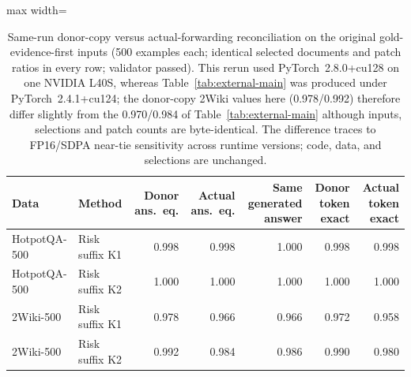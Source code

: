 \begin{table}[t]
\centering
\footnotesize
\begin{adjustbox}{max width=\textwidth}
\begin{tabular}{llrrrrr}
\toprule
Data & Method & Donor ans.\ eq. & Actual ans.\ eq. & Same generated answer & Donor token exact & Actual token exact \\
\midrule
HotpotQA-500 & Risk suffix K1 & 0.998 & 0.998 & 1.000 & 0.998 & 0.998 \\
HotpotQA-500 & Risk suffix K2 & 1.000 & 1.000 & 1.000 & 1.000 & 1.000 \\
2Wiki-500 & Risk suffix K1 & 0.978 & 0.966 & 0.966 & 0.972 & 0.958 \\
2Wiki-500 & Risk suffix K2 & 0.992 & 0.984 & 0.986 & 0.990 & 0.980 \\
\bottomrule
\end{tabular}
\end{adjustbox}
\caption{Same-run donor-copy versus actual-forwarding reconciliation on the original gold-evidence-first inputs (500 examples each; identical selected documents and patch ratios in every row; validator passed). This rerun used PyTorch~2.8.0+cu128 on one NVIDIA L40S, whereas Table~\ref{tab:external-main} was produced under PyTorch~2.4.1+cu124; the donor-copy 2Wiki values here (0.978/0.992) therefore differ slightly from the 0.970/0.984 of Table~\ref{tab:external-main} although inputs, selections and patch counts are byte-identical. The difference traces to FP16/SDPA near-tie sensitivity across runtime versions; code, data, and selections are unchanged.}
\label{tab:app-recon}
\end{table}
